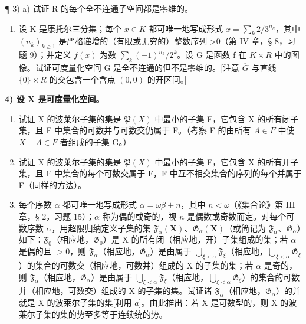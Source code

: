 ¶ 3) a) 试证 R 的每个全不连通子空间都是零维的。

\begin{enumerate}
\def\labelenumi{\alph{enumi})}
\setcounter{enumi}{1}
\tightlist
\item
  设 K 是康托尔三分集；每个 \(x \in K\) 都可唯一地写成形式 \(x = \sum_{k} 2/3^{n_k}\)，其中 \((n_k)_{k \geqslant 1}\) 是严格递增的（有限或无穷的）整数序列 \textgreater0（第 IV 章，§ 8，习题 9）；并定义 \(f(x)\) 为数 \(\sum_{k} (-1)^{n_k}/2^k\)。设 G 是函数 f 在 \(K \times R\) 中的图像。试证可度量化空间 G 是全不连通的但不是零维的。{[}注意 \(\overline{G}\) 与直线 \(\{0\} \times R\) 的交包含一个含点 \((0, 0)\) 的开区间。{]}
\end{enumerate}

\par\noindent\textbf{4) 设 \(\mathbf{X}\) 是可度量化空间。}\par

\begin{enumerate}
\def\labelenumi{\alph{enumi})}
\item
  试证 X 的波莱尔子集的集是 \(\mathfrak{P}(X)\) 中最小的子集 F，它包含 X 的所有闭子集，且 F 中集合的可数并与可数交仍属于 F。（考察 F 的由所有 \(A \in F\) 中使 \(X - A \in F\) 者组成的子集 G。）
\item
  试证 X 的波莱尔子集的集是 \(\mathfrak{P}(X)\) 中最小的子集 F，它包含 X 的所有开子集，且 F 中集合的每个可数交属于 F，F 中互不相交集合的序列的每个并属于 F（同样的方法）。
\item
  每个序数 \(\alpha\) 都可唯一地写成形式 \(\alpha = \omega\beta + n\)，其中 \(n < \omega\)（《集合论》第 III 章，§ 2，习题 15）；\(\alpha\) 称为偶的或奇的，视 \(n\) 是偶数或奇数而定。对每个可数序数 \(\alpha\)，用超限归纳定义子集的集 \(\mathfrak{F}_{\alpha}(\mathbf{X})\)、\(\mathfrak{G}_{\alpha}(\mathbf{X})\)（或简记为 \(\mathfrak{F}_{\alpha}\)、\(\mathfrak{G}_{\alpha}\)）如下：\(\mathfrak{F}_0\)（相应地，\(\mathfrak{G}_0\)）是 X 的所有闭（相应地，开）子集组成的集；若 \(\alpha\) 是偶的且 \(>0\)，则 \(\mathfrak{F}_{\alpha}\)（相应地，\(\mathfrak{G}_{\alpha}\)）是由属于 \(\bigcup_{\xi < \alpha} \mathfrak{F}_{\xi}\)（相应地，\(\bigcup_{\xi < \alpha} \mathfrak{G}_{\xi}\)）的集合的可数交（相应地，可数并）组成的 X 的子集的集；若 \(\alpha\) 是奇的，则 \(\mathfrak{F}_{\alpha}\)（相应地，\(\mathfrak{G}_{\alpha}\)）是由属于 \(\bigcup_{\xi < \alpha} \mathfrak{F}_{\xi}\)（相应地，\(\bigcup_{\xi < \alpha} \mathfrak{G}_{\xi}\)）的集合的可数并（相应地，可数交）组成的 X 的子集的集。试证诸 \(\mathfrak{F}_{\alpha}\)（相应地，\(\mathfrak{G}_{\alpha}\)）的并就是 X 的波莱尔子集的集{[}利用 \(a\){]}。由此推出：若 X 是可数型的，则 X 的波莱尔子集的集的势至多等于连续统的势。
\end{enumerate}

